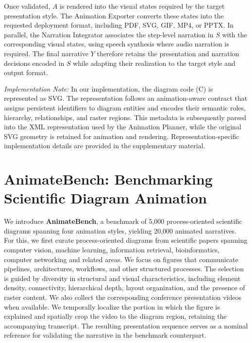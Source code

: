 \documentclass{article} %
\begin{document}
Once validated, $A$ is rendered into the visual states required by the target presentation style. The Animation Exporter converts these states into the requested deployment format, including PDF, SVG, GIF, MP4, or PPTX.  In parallel, the Narration Integrator associates the step-level narration in $S$ with the corresponding visual states, using speech synthesis where audio narration is required. The final narrative $Y$ therefore retains the presentation and narration decisions encoded in $S$ while adapting their realization to the target style and output format. 

\noindent \textit{Implementation Note:} In our implementation, the diagram code (C) is represented as SVG. The representation follows an animation-aware contract that assigns persistent identifiers to diagram entities and encodes their semantic roles, hierarchy, relationships, and raster regions. This metadata is subsequently parsed into the XML representation used by the Animation Planner, while the original SVG geometry is retained for animation and rendering. Representation-specific implementation details are provided in the supplementary material.



\section{AnimateBench: Benchmarking Scientific Diagram Animation}
\label{sec:animatebench}


We introduce \textbf{AnimateBench}, a benchmark of 5,000 process-oriented scientific diagrams spanning four animation styles, yielding 20,000 animated narratives. For this, we first curate process-oriented diagrams from scientific papers spanning computer vision, machine learning, information retrieval, bioinformatics, computer networking and related areas. We focus on figures that communicate pipelines, architectures, workflows, and other structured processes. The selection is guided by diversity in structural and visual characteristics, including element density, connectivity, hierarchical depth, layout organization, and the presence of raster content. We also collect the corresponding conference presentation videos when available. We temporally localize the portion in which the figure is explained and spatially crop the video to the diagram region, retaining the accompanying transcript. The resulting presentation sequence serves as a nominal reference for validating the narrative in the benchmark counterpart.
\end{document}
